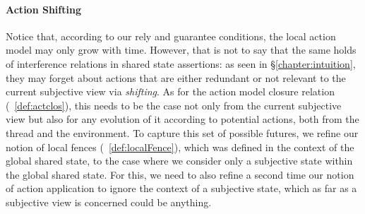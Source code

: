 \paragraph{Action Shifting}
Notice that, according to our rely and guarantee conditions, the local action model may only grow with time. However, that is not to say that the same holds of interference relations in shared state assertions: as seen in \S\ref{chapter:intuition}, they may forget about actions that are either redundant or not relevant to the current subjective view via \emph{shifting}. As for the action model closure relation (~\ref{def:actclos}), this needs to be the case not only from the current subjective view but also for any evolution of it according to potential actions, both from the thread and the environment. To capture this set of possible futures, we refine our notion of local fences (~\ref{def:localFence}), which was defined in the context of the global shared state, to the case where we consider only a subjective state within the global shared state.
For this, we need to also refine a second time our notion of action application to ignore the context of a subjective state, which as far as a subjective view is concerned could be anything.


